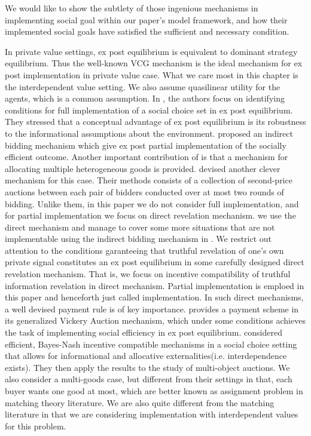   We would like to show the subtlety of those ingenious mechanisms in 
 implementing social goal within our paper's model framework, and how their implemented social goals have satisfied the sufficient and 
 necessary condition.

  
 
 In private value settings, ex post equilibrium is equivalent to dominant strategy
 equilibrium. Thus the well-known VCG mechanism is the ideal mechanism for ex post implementation in private value case. What we care
 most in this chapter is the interdependent value setting. We also assume quasilinear utility for the agents, which is a common 
 assumption. 
 In \parencite{BergemannM08}, the authors focus on identifying conditions for full implementation
 of a social choice set in ex post equilibrium. They stressed that a conceptual advantage of ex post equilibrium is its 
 robustness to the informational assumptions about the environment. \parencite{Maskin00} proposed an indirect bidding mechanism which
 give ex post partial implementation of the socially efficient outcome.
   Another important contribution of \parencite{Maskin00} is that a mechanism for allocating  multiple heterogeneous goods is 
 provided. \parencite{Perry2002} devised another clever mechanism for this case. Their methods consists of a collection of second-price 
 auctions between each pair of bidders conducted over at most two rounds of bidding. Unlike them, in this paper we do not consider 
 full implementation, and for partial implementation we focus on direct revelation mechanism. we use the direct mechanism and manage 
 to cover some more situations that are not implementable using the indirect bidding mechanism in \parencite{Maskin00}.
 We restrict out attention to the conditions garanteeing that truthful revelation of one's own private signal constitutes an ex post 
 equilibrium in some carefully designed direct revelation mechanism. That is, we focus on incentive compatibility of truthful
 information revelation in direct mechanism. Partial implementation is emploed in this paper and henceforth just called implementation.
 In such direct mechanisms,
 a well devised payment rule is of key importance. \parencite{Ausubel99} provides a payment scheme in its generalized Vickery Auction
 mechanism, which under some conditions achieves the task of implementing social efficiency in ex post equilibrium. 
 \parencite{Jehiel2001} considered efficient, Bayes-Nash incentive compatible mechanisms in a social choice setting that allows for informational and allocative externalities(i.e. interdependence exists). They then apply the results to the study of multi-object auctions. We also consider a multi-goods case, but different from their settings in that, each buyer wants one good at most, which are better known as assignment problem in matching theory literature\parencite{Roth1990}. We are also quite different from the matching literature in that we are considering implementation with interdependent values for this problem.

